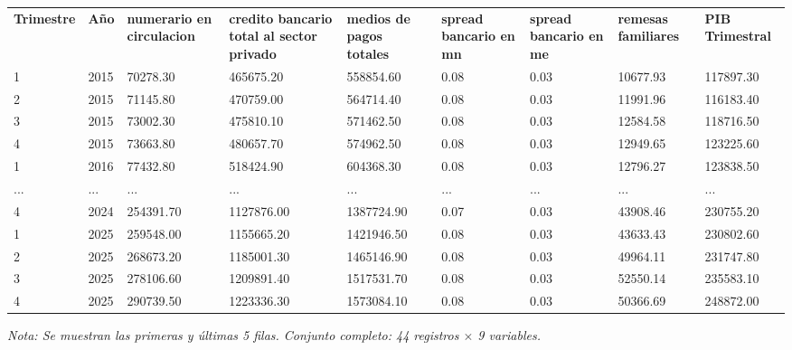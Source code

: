 

\begin{table}[htbp]

\centering

\begin{adjustbox}{max width=\textwidth}

\begin{tabular}{lllllllll}

\rowcolor{ThemeBackground}
\rule{0pt}{0.45cm}
\textcolor{ThemeGold}{\bfseries Trimestre} & \textcolor{ThemeGold}{\bfseries Año} & \textcolor{ThemeGold}{\bfseries numerario en circulacion} & \textcolor{ThemeGold}{\bfseries credito bancario total al sector privado} & \textcolor{ThemeGold}{\bfseries medios de pagos totales} & \textcolor{ThemeGold}{\bfseries spread bancario en mn} & \textcolor{ThemeGold}{\bfseries spread bancario en me} & \textcolor{ThemeGold}{\bfseries remesas familiares} & \textcolor{ThemeGold}{\bfseries PIB Trimestral} \\

1 & 2015 & 70278.30 & 465675.20 & 558854.60 & 0.08 & 0.03 & 10677.93 & 117897.30 \\
2 & 2015 & 71145.80 & 470759.00 & 564714.40 & 0.08 & 0.03 & 11991.96 & 116183.40 \\
3 & 2015 & 73002.30 & 475810.10 & 571462.50 & 0.08 & 0.03 & 12584.58 & 118716.50 \\
4 & 2015 & 73663.80 & 480657.70 & 574962.50 & 0.08 & 0.03 & 12949.65 & 123225.60 \\
1 & 2016 & 77432.80 & 518424.90 & 604368.30 & 0.08 & 0.03 & 12796.27 & 123838.50 \\
... & ... & ... & ... & ... & ... & ... & ... & ... \\
4 & 2024 & 254391.70 & 1127876.00 & 1387724.90 & 0.07 & 0.03 & 43908.46 & 230755.20 \\
1 & 2025 & 259548.00 & 1155665.20 & 1421946.50 & 0.08 & 0.03 & 43633.43 & 230802.60 \\
2 & 2025 & 268673.20 & 1185001.30 & 1465146.90 & 0.08 & 0.03 & 49964.11 & 231747.80 \\
3 & 2025 & 278106.60 & 1209891.40 & 1517531.70 & 0.08 & 0.03 & 52550.14 & 235583.10 \\
4 & 2025 & 290739.50 & 1223336.30 & 1573084.10 & 0.08 & 0.03 & 50366.69 & 248872.00 \\
\bottomrule
\end{tabular}

\end{adjustbox}

\vspace{0.15cm}
{\raggedright\sffamily\footnotesize\color{ThemeMuted}
\textit{Nota: Se muestran las primeras y últimas 5 filas. Conjunto completo: 44 registros $\times$ 9 variables.}}

\end{table}
